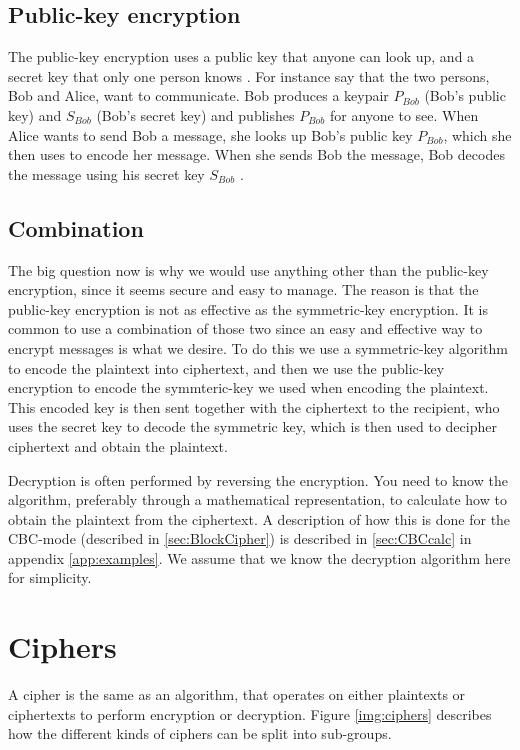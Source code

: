 \subsection{Public-key encryption}
The public-key encryption uses a public key that anyone can look up, and a 
secret key that only one person knows \citep[pp. 25--32]{Simmons:1992}.
For instance say that the two persons, Bob and Alice, want to communicate. 
Bob produces a keypair \(P_{Bob}\) (Bob’s public key) and \(S_{Bob}\) 
(Bob’s secret key) and publishes \(P_{Bob}\) for anyone to see. When Alice wants 
to send Bob a message, she looks up Bob’s public key \(P_{Bob}\), which she then 
uses to encode her message. When she sends Bob the message, Bob decodes the 
message using his secret key \(S_{Bob}\) \citep{Schneier:2003}.

\subsection{Combination}
The big question now is why we would use anything other than the public-key
encryption, since it seems secure and easy to manage. The reason is that the 
public-key encryption is not as effective as the symmetric-key encryption. 
It is common to use a combination of those two since an easy and effective way 
to encrypt messages is what we desire. To do this we use a symmetric-key 
algorithm to encode the plaintext into ciphertext, and then we use the 
public-key encryption to encode the symmteric-key we used when encoding the 
plaintext. This encoded key is then sent together with the ciphertext to the 
recipient, who uses the secret key to decode the symmetric key, which is then used to decipher ciphertext and obtain the plaintext.

Decryption is often performed by reversing the encryption. You need to know the 
algorithm, preferably through a mathematical representation, to calculate how 
to obtain the plaintext from the ciphertext. A description of how this is done 
for the CBC-mode (described in \ref{sec:BlockCipher}) is described in 
\ref{sec:CBCcalc} in appendix \ref{app:examples}. We assume that we know the 
decryption algorithm here for simplicity. 

\section{Ciphers}
A cipher is the same as an algorithm, that operates on either plaintexts or 
ciphertexts to perform encryption or decryption. Figure \ref{img:ciphers} 
describes how the different kinds of ciphers can be split into sub-groups.


